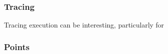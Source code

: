 \begin{frame}
  \frametitle{Tracing}
  Tracing execution can be interesting, particularly for 
\end{frame}

\begin{frame}
  \frametitle{Points}
\end{frame}
